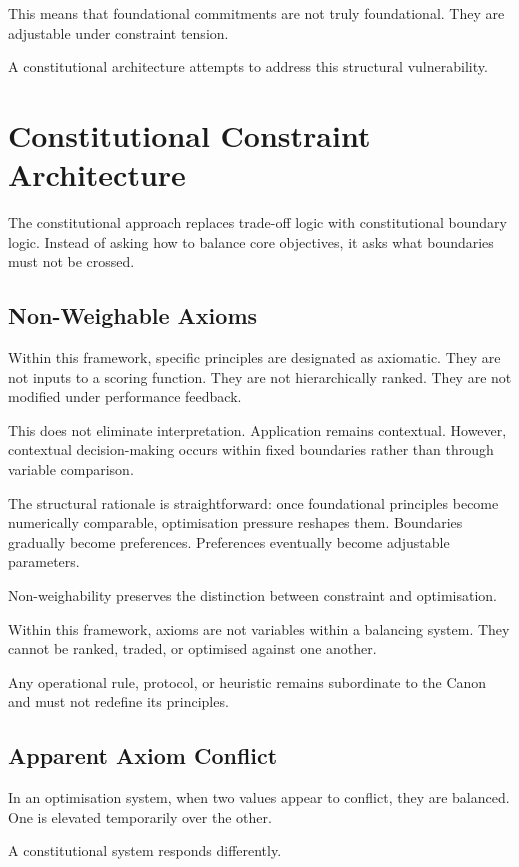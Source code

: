 \documentclass[11pt]{article}
\begin{document}
This means that foundational commitments are not truly foundational. They are adjustable under constraint tension.

A constitutional architecture attempts to address this structural vulnerability.

\section{Constitutional Constraint Architecture}

The constitutional approach replaces trade-off logic with constitutional boundary logic. Instead of asking how to balance core objectives, it asks what boundaries must not be crossed.

\subsection{Non-Weighable Axioms}

Within this framework, specific principles are designated as axiomatic. They are not inputs to a scoring function. They are not hierarchically ranked. They are not modified under performance feedback.

This does not eliminate interpretation. Application remains contextual. However, contextual decision-making occurs within fixed boundaries rather than through variable comparison.

The structural rationale is straightforward: once foundational principles become numerically comparable, optimisation pressure reshapes them. Boundaries gradually become preferences. Preferences eventually become adjustable parameters.

Non-weighability preserves the distinction between constraint and optimisation.

Within this framework, axioms are not variables within a balancing system. They cannot be ranked, traded, or optimised against one another.

Any operational rule, protocol, or heuristic remains subordinate to the Canon and must not redefine its principles.

\subsection{Apparent Axiom Conflict}

In an optimisation system, when two values appear to conflict, they are balanced. One is elevated temporarily over the other.

A constitutional system responds differently.
\end{document}
